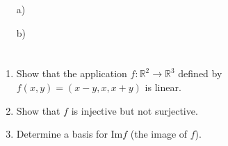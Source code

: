 \documentclass[12pt]{article}
\begin{document}
\begin{correctionbox}                                                                                                                                                                                                                    
 \begin{enumerate}                                                                                              
     \item[a)] 
     \item[b)] 
 \end{enumerate}                                                                                                
\end{correctionbox}                                                                                                                                                                                                                      
                                                                                                                                                                                                                                         
\section{}                                                                                                                                                                                                                               
\begin{enumerate}
    \item Show that the application $f: \mathbb{R}^2 \to \mathbb{R}^3$ defined by $f(x, y) = (x - y, x, x + y)$ is linear.
    \item Show that $f$ is injective but not surjective.
    \item Determine a basis for $\text{Im}f$ (the image of $f$).
\end{enumerate}
                                                                                                                                                                                                                                         
\end{document}
